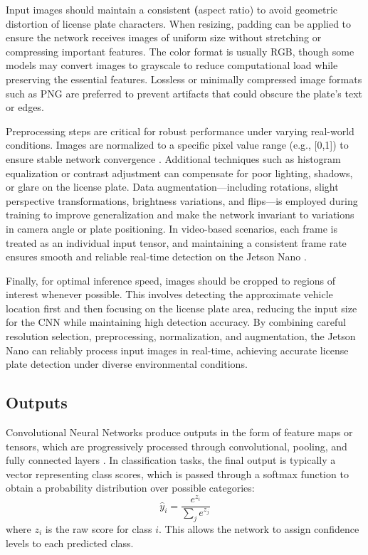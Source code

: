 Input images should maintain a consistent \textbf(aspect ratio) to avoid geometric distortion of license plate characters. When resizing, padding can be applied to ensure the network receives images of uniform size without stretching or compressing important features. The color format is usually RGB, though some models may convert images to grayscale to reduce computational load while preserving the essential features. Lossless or minimally compressed image formats such as PNG are preferred to prevent artifacts that could obscure the plate’s text or edges.

Preprocessing steps are critical for robust performance under varying real-world conditions. Images are normalized to a specific pixel value range (e.g., [0,1]) to ensure stable network convergence \cite{pytorchdocs}. Additional techniques such as histogram equalization or contrast adjustment can compensate for poor lighting, shadows, or glare on the license plate. Data augmentation—including rotations, slight perspective transformations, brightness variations, and flips—is employed during training to improve generalization and make the network invariant to variations in camera angle or plate positioning. In video-based scenarios, each frame is treated as an individual input tensor, and maintaining a consistent frame rate ensures smooth and reliable real-time detection on the Jetson Nano \cite{pinto2022springer, jetsonpytorch}.

Finally, for optimal inference speed, images should be cropped to regions of interest whenever possible. This involves detecting the approximate vehicle location first and then focusing on the license plate area, reducing the input size for the CNN while maintaining high detection accuracy. By combining careful resolution selection, preprocessing, normalization, and augmentation, the Jetson Nano can reliably process input images in real-time, achieving accurate license plate detection under diverse environmental conditions.

\subsection{Outputs}

Convolutional Neural Networks produce outputs in the form of feature maps or tensors, which are progressively processed through convolutional, pooling, and fully connected layers \cite{goodfellow2016deep, pinto2022springer}. In classification tasks, the final output is typically a vector representing class scores, which is passed through a softmax function to obtain a probability distribution over possible categories:
\[
\hat{y}_i = \frac{e^{z_i}}{\sum_{j} e^{z_j}}
\]
where \(z_i\) is the raw score for class \(i\). This allows the network to assign confidence levels to each predicted class.

